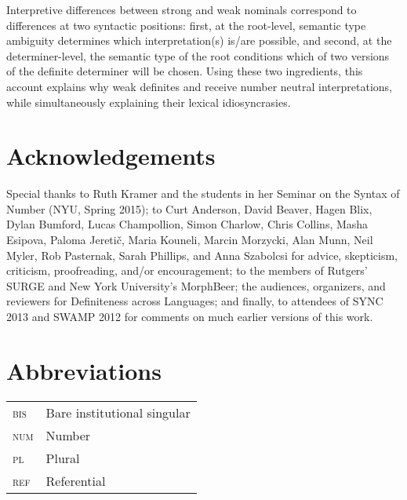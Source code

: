 \documentclass[output=paper,
modfonts
]{langscibook}
\begin{document}
Interpretive differences between strong and weak nominals correspond to differences at two syntactic positions: first, at the root-level, semantic type ambiguity determines which interpretation(s) is/are possible, and second, at the determiner-level, the semantic type of the root conditions which of two versions of the definite determiner will be chosen. Using these two ingredients, this account explains why weak definites and  receive number neutral interpretations, while simultaneously explaining their lexical idio\-syncrasies.

\section*{Acknowledgements}
Special thanks to Ruth Kramer and the students in her Seminar on the Syntax of Number (NYU, Spring 2015); to Curt Anderson, David Beaver, Hagen Blix, Dylan Bumford, Lucas Champollion, Simon Charlow,  Chris Collins, Masha Esipova, Paloma Jereti{\v c}, Maria Kouneli, Marcin Morzycki, Alan Munn, Neil Myler, Rob Pasternak, Sarah Phillips, and Anna Szabolcsi for advice, skepticism, criticism, proofreading, and/or encouragement; to the members of Rutgers' SURGE and New York University's MorphBeer; the audiences, organizers, and reviewers for Definiteness across Languages; and finally, to attendees of SYNC 2013 and SWAMP 2012 for comments on much earlier versions of this work. 

\section*{Abbreviations}
\begin{tabular}{ll}
	\textsc{bis} & Bare institutional singular \\
	\textsc{num} & Number \\
	\textsc{pl} & Plural \\
	\textsc{ref} & Referential \\
\end{tabular}

{\sloppy
\printbibliography[heading=subbibliography,notkeyword=this]
}
\end{document}
